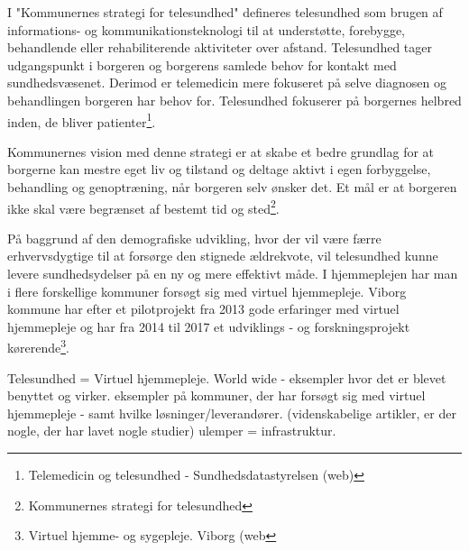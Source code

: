 I "Kommunernes strategi for telesundhed" defineres telesundhed som brugen af informations- og kommunikationsteknologi til at understøtte, forebygge, behandlende eller rehabiliterende aktiviteter over afstand. Telesundhed tager udgangspunkt i borgeren og borgerens samlede behov for kontakt med sundhedsvæsenet. Derimod er telemedicin mere fokuseret på selve diagnosen og behandlingen borgeren har behov for. Telesundhed fokuserer på borgernes helbred inden, de bliver patienter\footnote{Telemedicin og telesundhed - Sundhedsdatastyrelsen (web)}.

Kommunernes vision med denne strategi er at skabe et bedre grundlag for at borgerne kan mestre eget liv og tilstand og deltage aktivt i egen forbyggelse, behandling og genoptræning, når borgeren selv ønsker det. Et mål er at borgeren ikke skal være begrænset af bestemt tid og sted\footnote{Kommunernes strategi for telesundhed}.

På baggrund af den demografiske udvikling, hvor der vil være færre erhvervsdygtige til at forsørge den stignede ældrekvote, vil telesundhed kunne levere sundhedsydelser på en ny og mere effektivt måde. I hjemmeplejen har man i flere forskellige kommuner forsøgt sig med virtuel hjemmepleje. Viborg kommune har efter et pilotprojekt fra 2013 gode erfaringer med virtuel hjemmepleje og har fra 2014 til 2017 et  udviklings - og forskningsprojekt kørerende\footnote{Virtuel hjemme- og sygepleje. Viborg (web}.  


  


 

 


Telesundhed = Virtuel hjemmepleje. World wide - eksempler hvor det er blevet benyttet og virker. eksempler på kommuner, der har forsøgt sig med virtuel hjemmepleje - samt hvilke løsninger/leverandører. (videnskabelige artikler, er der nogle, der har lavet nogle studier) 
ulemper = infrastruktur.
 

